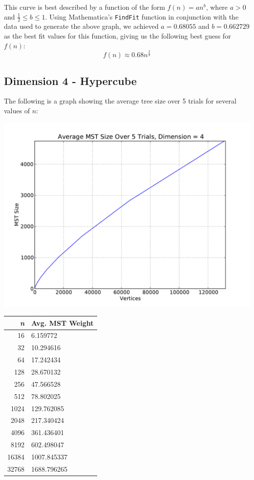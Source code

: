 \documentclass[solution, letterpaper]{cs121}
\begin{document}
This curve is best described by a function of the form $f(n)=an^b$, where $a > 0$ and $\frac{1}{2} \leq b \leq 1$. Using Mathematica's {\tt FindFit} function in conjunction with the data used to generate the above graph, we achieved $a=0.68055$ and $b=0.662729$ as the best fit values for this function, giving us the following best guess for $f(n)$:
\[f(n) \approx 0.68n^{\frac{2}{3}}\]

\pagebreak

\subsection*{Dimension 4 - Hypercube}

The following is a graph showing the average tree size over 5 trials for several values of $n$:
\begin{center}
\includegraphics[scale=0.6]{graphs/kruskals-dimension-4.pdf}
\begin{tabular}{ | r | l |}
\hline
\bf{\itshape{n}} & \bf{Avg. MST Weight} \\
\hline
16 & 6.159772 \\
\hline
32 & 10.294616 \\
\hline
64 & 17.242434 \\
\hline
128 & 28.670132 \\
\hline
256 & 47.566528 \\
\hline
512 & 78.802025 \\
\hline
1024 & 129.762085 \\
\hline
2048 & 217.340424 \\
\hline
4096 & 361.436401 \\
\hline
8192 & 602.498047 \\
\hline
16384 & 1007.845337 \\
\hline
32768 & 1688.796265 \\
\hline
\end{tabular}
\end{center}
\end{document}
